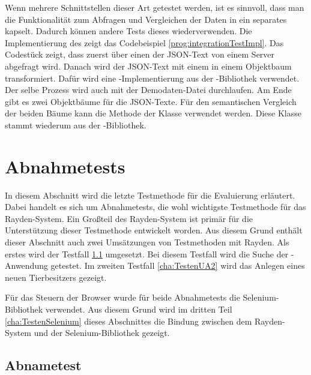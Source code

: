 \SuperPar
Wenn mehrere Schnittstellen dieser Art getestet werden, ist es sinnvoll, dass man die Funktionalität zum Abfragen und Vergleichen der Daten in ein separates  kapselt. Dadurch können andere Tests dieses  wiederverwenden. Die Implementierung des  zeigt das Codebeispiel \ref{prog:integrationTestImpl}. Das Codestück zeigt, dass zuerst über einen  der JSON-Text von einem Server abgefragt wird. Danach wird der JSON-Text mit einem  in einem Objektbaum transformiert. Dafür wird eine -Implementierung aus der -Bibliothek verwendet. Der selbe Prozess wird auch mit der Demodaten-Datei durchlaufen. Am Ende gibt es zwei Objektbäume für die JSON-Texte. Für den semantischen Vergleich der beiden Bäume kann die Methode  der Klasse  verwendet werden. Diese Klasse stammt wiederum aus der -Bibliothek.

\section{Abnahmetests}
\label{cha:TestenUA}

In diesem Abschnitt wird die letzte Testmethode für die Evaluierung erläutert. Dabei handelt es sich um Abnahmetests, die wohl wichtigste Testmethode für das Rayden-System. Ein Großteil des Rayden-System ist primär für die Unterstützung dieser Testmethode entwickelt worden. Aus diesem Grund enthält dieser Abschnitt auch zwei Umsätzungen von Testmethoden mit Rayden. Als erstes wird der Testfall  \ref{cha:TestenUA1} umgesetzt. Bei diesem Testfall wird die Suche der -Anwendung getestet. Im zweiten Testfall \ref{cha:TestenUA2} wird das Anlegen eines neuen Tierbesitzers gezeigt. 

\SuperPar
Für das Steuern der Browser wurde für beide Abnahmetests die Selenium-Bibliothek verwendet. Aus diesem Grund wird im dritten Teil \ref{cha:TestenSelenium} dieses Abschnittes die Bindung zwischen dem Rayden-System und der Selenium-Bibliothek gezeigt. 


\subsection{Abnametest }
\label{cha:TestenUA1}

